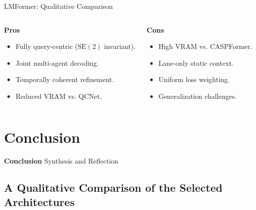 \documentclass[10pt,aspectratio=169]{beamer}
\newcommand{\greenoplus}{\textcolor{mygreen}{\ding{51}}}
\newcommand{\redominus}{\textcolor{myred}{\ding{55}}}
\begin{document}
\begin{frame}{LMFormer: Qualitative Comparison}
    \begin{columns}[T]
        \begin{column}{0.5\textwidth}
            \textbf{Pros} \greenoplus
            \begin{itemize}
                \item Fully query-centric (\(\mathrm{SE}(2)\) invariant).
                \item Joint multi-agent decoding.
                \item Temporally coherent refinement.
                \item Reduced VRAM vs. QCNet.
            \end{itemize}
        \end{column}
        \begin{column}{0.5\textwidth}
            \textbf{Cons} \redominus
            \begin{itemize}
                \item High VRAM vs. CASPFormer.
                \item Lane-only static context.
                \item Uniform loss weighting.
                \item Generalization challenges.
            \end{itemize}
        \end{column}
    \end{columns}
\end{frame}

\section{Conclusion}

\begin{frame}[plain]
  \begin{center}
    \vfill
    {\Huge \textbf{Conclusion}}
    \vfill
    {\Large Synthesis and Reflection}
    \vfill
  \end{center}
\end{frame}

\subsection{A Qualitative Comparison of the Selected Architectures}
\end{document}
